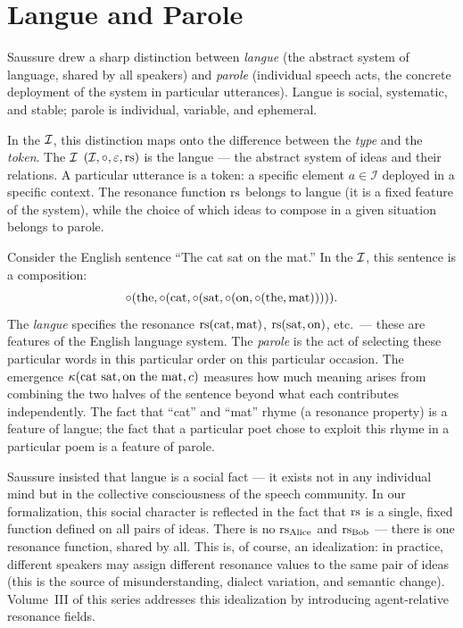 \section{Langue and Parole}

Saussure drew a sharp distinction between \emph{langue} (the abstract
system of language, shared by all speakers) and \emph{parole}
(individual speech acts, the concrete deployment of the system in
particular utterances). Langue is social, systematic, and stable;
parole is individual, variable, and ephemeral.

In the $\mathcal{I}$, this distinction maps onto the difference between the
\emph{type} and the \emph{token}. The $\mathcal{I}$ $(\mathcal{I}, \circ,
\varepsilon, \mathrm{rs})$ is the langue --- the abstract system of ideas and their
relations. A particular utterance is a token: a specific element
$a \in \mathcal{I}$ deployed in a specific context. The resonance
function $\mathrm{rs}$ belongs to langue (it is a fixed feature of the system),
while the choice of which ideas to compose in a given situation belongs
to parole.

\begin{example}
Consider the English sentence ``The cat sat on the mat.'' In the
$\mathcal{I}$, this sentence is a composition:
\[
  \circ(\text{the}, \circ(\text{cat}, \circ(\text{sat},
  \circ(\text{on}, \circ(\text{the}, \text{mat}))))).
\]
The \emph{langue} specifies the resonance $\mathrm{rs}(\text{cat}, \text{mat})$,
$\mathrm{rs}(\text{sat}, \text{on})$, etc.\ --- these are features of the
English language system. The \emph{parole} is the act of selecting
these particular words in this particular order on this particular
occasion. The emergence $\kappa(\text{cat sat}, \text{on the mat}, c)$
measures how much meaning arises from combining the two halves of the
sentence beyond what each contributes independently. The fact that
``cat'' and ``mat'' rhyme (a resonance property) is a feature of
langue; the fact that a particular poet chose to exploit this rhyme
in a particular poem is a feature of parole.
\end{example}

\begin{remark}
Saussure insisted that langue is a social fact --- it exists not in any
individual mind but in the collective consciousness of the speech
community. In our formalization, this social character is reflected in
the fact that $\mathrm{rs}$ is a single, fixed function defined on all pairs of
ideas. There is no $\mathrm{rs}_{\text{Alice}}$ and $\mathrm{rs}_{\text{Bob}}$ --- there
is one resonance function, shared by all. This is, of course, an
idealization: in practice, different speakers may assign different
resonance values to the same pair of ideas (this is the source of
misunderstanding, dialect variation, and semantic change). Volume~III
of this series addresses this idealization by introducing
agent-relative resonance fields.
\end{remark}

